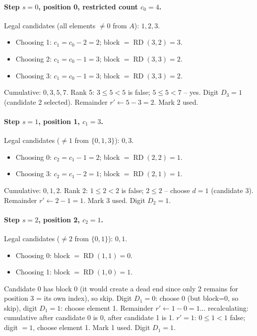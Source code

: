 \documentclass[11pt,a4paper]{article}
\newcommand{\rder}[2]{\operatorname{RD}(#1,#2)} %
\begin{document}
    \paragraph{Step $s=0$, position 0, restricted count $c_0 = 4$.}
    Legal candidates (all elements $\neq 0$ from $A$): $1,2,3$.
    \begin{itemize}
        \item Choosing 1: $c_1 = c_0 - 2 = 2$; block $= \rder{3}{2} = 3$.
        \item Choosing 2: $c_1 = c_0 - 1 = 3$; block $= \rder{3}{3} = 2$.
        \item Choosing 3: $c_1 = c_0 - 1 = 3$; block $= \rder{3}{3} = 2$.
    \end{itemize}
    Cumulative: $0, 3, 5, 7$. Rank 5: $3 \leq 5 < 5$ is false; $5 \leq 5 < 7$ -- yes.
    Digit $D_3 = 1$ (candidate 2 selected). Remainder $r' \leftarrow 5-3 = 2$.
    Mark 2 used.

    \paragraph{Step $s=1$, position 1, $c_1 = 3$.}
    Legal candidates ($\neq 1$ from $\{0,1,3\}$): $0,3$.
    \begin{itemize}
        \item Choosing 0: $c_2 = c_1 - 1 = 2$; block $= \rder{2}{2} = 1$.
        \item Choosing 3: $c_2 = c_1 - 2 = 1$; block $= \rder{2}{1} = 1$.
    \end{itemize}
    Cumulative: $0, 1, 2$. Rank 2: $1 \leq 2 < 2$ is false; $2 \leq 2$ -- choose $d=1$ (candidate 3).
    Remainder $r' \leftarrow 2-1 = 1$. Mark 3 used. Digit $D_2 = 1$.

    \paragraph{Step $s=2$, position 2, $c_2 = 1$.}
    Legal candidates ($\neq 2$ from $\{0,1\}$): $0,1$.
    \begin{itemize}
        \item Choosing 0: block $= \rder{1}{1} = 0$.
        \item Choosing 1: block $= \rder{1}{0} = 1$.
    \end{itemize}
    Candidate 0 has block 0 (it would create a dead end since only 2 remains
    for position 3 = its own index), so skip. Digit $D_1 = 0$: choose 0
    (but block=0, so skip), digit $D_1 = 1$: choose element 1.
    Remainder $r' \leftarrow 1-0 = 1$... recalculating: cumulative after
    candidate 0 is 0, after candidate 1 is 1. $r' = 1$: $0 \leq 1 < 1$ false;
    digit $= 1$, choose element 1. Mark 1 used. Digit $D_1 = 1$.
\end{document}
